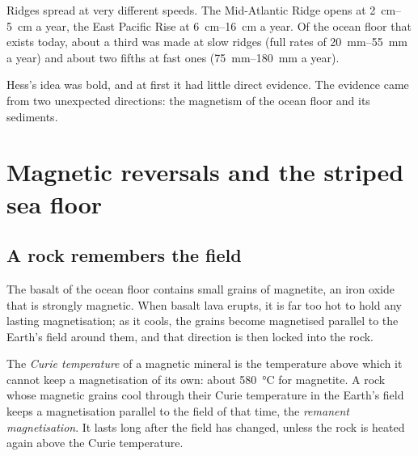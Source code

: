 Ridges spread at very different speeds. The Mid-Atlantic Ridge opens at
\qtyrange{2}{5}{cm} a year, the East Pacific Rise at \qtyrange{6}{16}{cm} a
year. Of the ocean floor that exists today, about a third was made at slow
ridges (full rates of \qtyrange{20}{55}{mm} a year) and about two fifths at
fast ones (\qtyrange{75}{180}{mm} a year).

Hess's idea was bold, and at first it had little direct evidence. The evidence
came from two unexpected directions: the magnetism of the ocean floor and its
sediments.

\section{Magnetic reversals and the striped sea floor}

\subsection{A rock remembers the field}

The basalt of the ocean floor contains small grains of magnetite, an iron
oxide that is strongly magnetic. When basalt lava erupts, it is far too hot to
hold any lasting magnetisation; as it cools, the grains become magnetised
parallel to the Earth's field around them, and that direction is then locked
into the rock.

\begin{definition}\label{def:g11:drift-to-spreading:remanence}
The \emph{Curie temperature} of a magnetic mineral is
the temperature above which it cannot keep a magnetisation of its own: about
\qty{580}{\celsius} for magnetite. A rock whose magnetic grains cool through
their Curie temperature in the Earth's field keeps a magnetisation parallel to
the field of that time, the
\emph{remanent magnetisation}. It lasts long after the field has changed, unless the rock is
heated again above the Curie temperature.
\end{definition}

